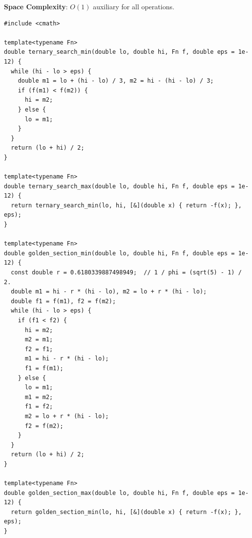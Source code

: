 \textbf{Space Complexity}: $O(1)$ auxiliary for all operations.

\begin{lstlisting}[style=cpp]
#include <cmath>

template<typename Fn>
double ternary_search_min(double lo, double hi, Fn f, double eps = 1e-12) {
  while (hi - lo > eps) {
    double m1 = lo + (hi - lo) / 3, m2 = hi - (hi - lo) / 3;
    if (f(m1) < f(m2)) {
      hi = m2;
    } else {
      lo = m1;
    }
  }
  return (lo + hi) / 2;
}

template<typename Fn>
double ternary_search_max(double lo, double hi, Fn f, double eps = 1e-12) {
  return ternary_search_min(lo, hi, [&](double x) { return -f(x); }, eps);
}

template<typename Fn>
double golden_section_min(double lo, double hi, Fn f, double eps = 1e-12) {
  const double r = 0.6180339887498949;  // 1 / phi = (sqrt(5) - 1) / 2.
  double m1 = hi - r * (hi - lo), m2 = lo + r * (hi - lo);
  double f1 = f(m1), f2 = f(m2);
  while (hi - lo > eps) {
    if (f1 < f2) {
      hi = m2;
      m2 = m1;
      f2 = f1;
      m1 = hi - r * (hi - lo);
      f1 = f(m1);
    } else {
      lo = m1;
      m1 = m2;
      f1 = f2;
      m2 = lo + r * (hi - lo);
      f2 = f(m2);
    }
  }
  return (lo + hi) / 2;
}

template<typename Fn>
double golden_section_max(double lo, double hi, Fn f, double eps = 1e-12) {
  return golden_section_min(lo, hi, [&](double x) { return -f(x); }, eps);
}


\end{lstlisting}
